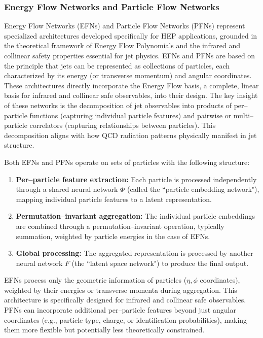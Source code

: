     \subsubsection{Energy Flow Networks and Particle Flow Networks}
        Energy Flow Networks (EFNs) and Particle Flow Networks (PFNs)\kd{} represent specialized architectures developed specifically for HEP applications, grounded in the theoretical framework of Energy Flow Polynomials and the infrared and collinear safety properties essential for jet physics.
        EFNs and PFNs are based on the principle that jets can be represented as collections of particles, each characterized by its energy (or transverse momentum) and angular coordinates.
        These architectures directly incorporate the Energy Flow basis, a complete, linear basis for infrared and collinear safe observables, into their design.
        The key insight of these networks is the decomposition of jet observables into products of per--particle functions (capturing individual particle features) and pairwise or multi--particle correlators (capturing relationships between particles).
        This decomposition aligns with how QCD radiation patterns physically manifest in jet structure.

        Both EFNs and PFNs operate on sets of particles with the following structure:
        \begin{enumerate}
            \item \textbf{Per--particle feature extraction:} Each particle is processed independently through a shared neural network \(\Phi\) (called the ``particle embedding network"), mapping individual particle features to a latent representation.
            \item \textbf{Permutation--invariant aggregation:} The individual particle embeddings are combined through a permutation--invariant operation, typically summation, weighted by particle energies in the case of EFNs.
            \item \textbf{Global processing:} The aggregated representation is processed by another neural network \(F\) (the ``latent space network") to produce the final output.
        \end{enumerate}
        EFNs process only the geometric information of particles (\(\eta,\phi\) coordinates), weighted by their energies or transverse momenta during aggregation.
        This architecture is specifically designed for infrared and collinear safe observables.
        PFNs can incorporate additional per--particle features beyond just angular coordinates (e.g., particle type, charge, or identification probabilities), making them more flexible but potentially less theoretically constrained.

